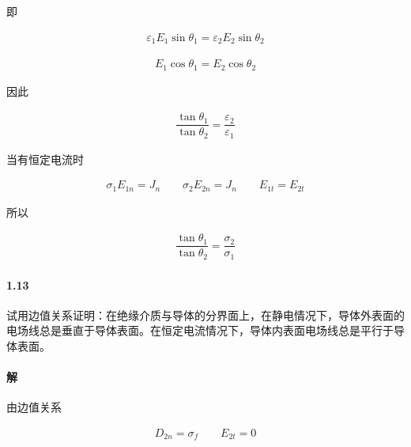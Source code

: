 \documentclass{article}
\begin{document}
即

\begin{equation*}
  \begin{aligned}
    \varepsilon_1 E_1 \sin \theta_1 = \varepsilon_2 E_2 \sin \theta_2
  \end{aligned}
\end{equation*}

\begin{equation*}
  \begin{aligned}
    E_1 \cos \theta_1 = E_2 \cos \theta_2
  \end{aligned}
\end{equation*}

因此

\begin{equation*}
  \begin{aligned}
    \dfrac{\tan \theta_1}{\tan \theta_2} = \dfrac{\varepsilon_2}{\varepsilon_1}  
  \end{aligned}
\end{equation*}

当有恒定电流时

\begin{equation*}
  \begin{aligned}
    \sigma_1 E_{1n} = J_n
    \quad\quad
    \sigma_2 E_{2n} = J_n
    \quad\quad
    E_{1t} = E_{2t}
  \end{aligned}
\end{equation*}

所以

\begin{equation*}
  \begin{aligned}
     \dfrac{\tan \theta_1}{\tan \theta_2} = \dfrac{\sigma_2}{\sigma_1}  
  \end{aligned}
\end{equation*}

\paragraph{1.13}

试用边值关系证明：在绝缘介质与导体的分界面上，在静电情况下，导体外表面的电场线总是垂直于导体表面。在恒定电流情况下，导体内表面电场线总是平行于导体表面。

\paragraph{解}

由边值关系

\begin{equation*}
  \begin{aligned}
    D_{2n} = \sigma_f
    \quad\quad
    E_{2t} = 0
  \end{aligned}
\end{equation*}
\end{document}
